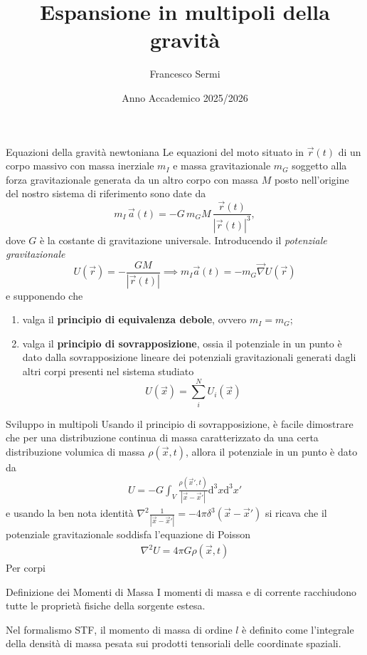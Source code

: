 \documentclass[8pt, aspectratio=169]{beamer}
\title{Espansione in multipoli della gravità}
\author{Francesco Sermi}
\institute{Relatore: Prof. Leonardo Gualtieri}
\date{Anno Accademico 2025/2026}
\begin{document}
\maketitle

\begin{frame}{Equazioni della gravità newtoniana}
	Le equazioni del moto situato in $\vec{r}(t)$ di un corpo massivo con massa inerziale $m_I$ e massa gravitazionale $m_G$ soggetto alla forza gravitazionale generata da un altro corpo con massa $M$ posto nell'origine del nostro sistema di riferimento sono date da
$$
m_I \, \vec{a}(t) = -G\, m_G M \, \frac{\vec{r}(t)}{|\vec{r}(t)|^3},
$$
dove $G$ è la costante di gravitazione universale. Introducendo il \emph{potenziale gravitazionale}
$$
	U(\vec{r}) = -\frac{GM}{|\vec{r}(t)|} \implies m_I \vec{a}(t) = -m_G \vec{\nabla} U(\vec{r})
$$
e supponendo che
\begin{enumerate}
	\item valga il \textbf{principio di equivalenza debole}, ovvero $m_I = m_G$;
	\item valga il \textbf{principio di sovrapposizione}, ossia il potenziale in un punto è dato dalla sovrapposizione lineare dei potenziali gravitazionali generati dagli altri corpi presenti nel sistema studiato
	$$
		U(\vec{x}) = \sum_i^N U_i(\vec{x})
	$$
\end{enumerate}
\end{frame}
\begin{frame}{Sviluppo in multipoli}
Usando il principio di sovrapposizione, è facile dimostrare che per una distribuzione continua di massa caratterizzato da una certa distribuzione volumica di massa $\rho(\vec{x},t)$, allora il potenziale in un punto è dato da
\begin{align*}
	U = -G\int_V \frac{\rho(\vec{x}', t)}{|\vec{x} - \vec{x}'|} \mathrm{d}^3 x \mathrm{d}^3 x'
\end{align*}
e usando la ben nota identità $\nabla^2 \frac{1}{|\vec{x} - \vec{x}'|} = -4 \pi \delta^3(\vec{x} - \vec{x}')$ si ricava che il potenziale gravitazionale soddisfa l'equazione di Poisson
\begin{align*}
	\nabla^2 U = 4 \pi G \rho(\vec{x}, t)
\end{align*}
Per corpi 
\end{frame}

\begin{frame}{Definizione dei Momenti di Massa}
I momenti di massa e di corrente racchiudono tutte le proprietà fisiche della sorgente estesa.

\bigskip
Nel formalismo STF, il momento di massa di ordine $l$ è definito come l'integrale della densità di massa pesata sui prodotti tensoriali delle coordinate spaziali.
\end{frame}
\end{document}
